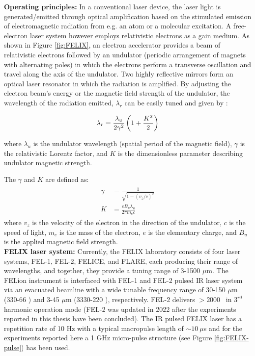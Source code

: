 \textbf{Operating principles:} In a conventional laser device, the laser light is generated/emitted through optical amplification based on the stimulated emission of electromagnetic radiation from e.g. an atom or a molecular excitation. A free-electron laser system however employs relativistic electrons as a gain medium. As shown in Figure \ref{fig:FELIX}, an electron accelerator provides a beam of relativistic electrons followed by an undulator (periodic arrangement of magnets with alternating poles) in which the electrons perform a transverse oscillation and travel along the axis of the undulator. Two highly reflective mirrors form an optical laser resonator in which the radiation is amplified. By adjusting the electron beam's energy or the magnetic field strength of the undulator, the wavelength of the radiation emitted, $\lambda_r$ can be easily tuned and given by \cite{oepts_free-electron-laser_1995}:

\[\lambda_r = \frac{\lambda_u}{2\gamma^2} \left( 1 + \frac{K^2}{2} \right)\]

where $\lambda_u$ is the undulator wavelength (spatial period of the magnetic field), $\gamma$ is the relativistic Lorentz factor, and $K$ is the dimensionless parameter describing undulator magnetic strength.

The $\gamma$ and $K$ are defined as:
\begin{align*}
    \begin{split}
        \gamma &= \frac{1}{\sqrt{1-(v_z/c)^2}}\\
        K &= \frac{eB_u\lambda_u}{2\pi m_e c}
    \end{split}
\end{align*}
where $v_z$ is the velocity of the electron in the direction of the undulator, $c$ is the speed of light, $m_e$ is the mass of the electron, $e$ is the elementary charge, and $B_u$ is the applied magnetic field strength.\\

\textbf{FELIX laser system:} Currently, the FELIX laboratory consists of four laser systems, FEL-1, FEL-2, FELICE, and FLARE, each producing their range of wavelengths, and together, they provide a tuning range of 3-1500 $\mu$m. The FELion instrument is interfaced with FEL-1 and FEL-2 pulsed IR laser system via an evacuated beamline with a wide tunable frequency range of 30-150 $\mu$m (330-66 \wn) and 3-45 $\mu$m (3330-220 \wn), respectively. FEL-2 delivers $> 2000$ \wn\ in $3^{rd}$ harmonic operation mode (FEL-2 was updated in 2022 after the experiments reported in this thesis have been concluded). The IR pulsed FELIX laser has a repetition rate of 10 Hz with a typical macropulse length of $\sim  10\ \mu$s and for the experiments reported here a 1 GHz micro-pulse structure (see Figure \ref{fig:FELIX-pulse}) has been used. 

